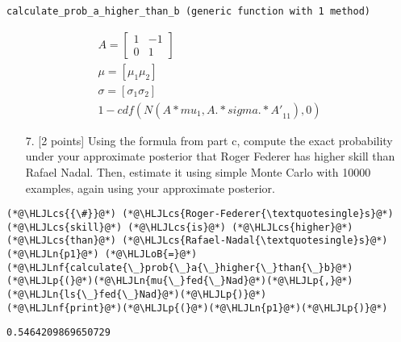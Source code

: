 \documentclass[12pt,a4paper]{article}
\newcommand{\HLJLn}[1]{#1}
\newcommand{\HLJLnf}[1]{\textcolor[RGB]{66,102,213}{#1}}
\newcommand{\HLJLoB}[1]{\textcolor[RGB]{102,102,102}{\textbf{#1}}}
\newcommand{\HLJLp}[1]{#1}
\newcommand{\HLJLcs}[1]{\textcolor[RGB]{153,153,119}{\textit{#1}}}
\begin{document}
\begin{lstlisting}
calculate_prob_a_higher_than_b (generic function with 1 method)
\end{lstlisting}



\begin{align}
A =
\begin{bmatrix}
1 & -1\\
0 & 1
\end{bmatrix}\\
\mu = [\mu_1 \mu_2]\\
\sigma = [\sigma_1 \sigma_2]\\
1 - cdf(N({A * mu}_1, {A .* sigma .* A'}_{11}), 0)
\end{align}
\begin{itemize}
\item[7. ] [2 points] Using the formula from part c, compute the exact probability under your approximate posterior that Roger Federer has higher skill than Rafael Nadal. Then, estimate it using simple Monte Carlo with 10000 examples, again using your approximate posterior.

\end{itemize}

\begin{lstlisting}
(*@\HLJLcs{{\#}}@*) (*@\HLJLcs{Roger-Federer{\textquotesingle}s}@*) (*@\HLJLcs{skill}@*) (*@\HLJLcs{is}@*) (*@\HLJLcs{higher}@*) (*@\HLJLcs{than}@*) (*@\HLJLcs{Rafael-Nadal{\textquotesingle}s}@*)
(*@\HLJLn{p1}@*) (*@\HLJLoB{=}@*) (*@\HLJLnf{calculate{\_}prob{\_}a{\_}higher{\_}than{\_}b}@*)(*@\HLJLp{(}@*)(*@\HLJLn{mu{\_}fed{\_}Nad}@*)(*@\HLJLp{,}@*) (*@\HLJLn{ls{\_}fed{\_}Nad}@*)(*@\HLJLp{)}@*)
(*@\HLJLnf{print}@*)(*@\HLJLp{(}@*)(*@\HLJLn{p1}@*)(*@\HLJLp{)}@*)
\end{lstlisting}

\begin{lstlisting}
0.5464209869650729
\end{lstlisting}
\end{document}
